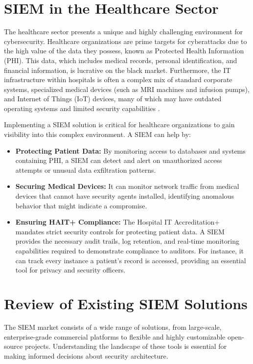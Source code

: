 \section{SIEM in the Healthcare Sector}
\label{sec:siem-in-healthcare}
The healthcare sector presents a unique and highly challenging environment for cybersecurity. Healthcare organizations are prime targets for cyberattacks due to the high value of the data they possess, known as Protected Health Information (PHI). This data, which includes medical records, personal identification, and financial information, is lucrative on the black market. Furthermore, the IT infrastructure within hospitals is often a complex mix of standard corporate systems, specialized medical devices (such as MRI machines and infusion pumps), and Internet of Things (IoT) devices, many of which may have outdated operating systems and limited security capabilities \cite{kruse_healthcare_cybersecurity}.

Implementing a SIEM solution is critical for healthcare organizations to gain visibility into this complex environment. A SIEM can help by:
\begin{itemize}
    \item \textbf{Protecting Patient Data:} By monitoring access to databases and systems containing PHI, a SIEM can detect and alert on unauthorized access attempts or unusual data exfiltration patterns.
    \item \textbf{Securing Medical Devices:} It can monitor network traffic from medical devices that cannot have security agents installed, identifying anomalous behavior that might indicate a compromise.
    \item \textbf{Ensuring HAIT+ Compliance:} The Hospital IT Accreditation+ mandates strict security controls for protecting patient data. A SIEM provides the necessary audit trails, log retention, and real-time monitoring capabilities required to demonstrate compliance to auditors. For instance, it can track every instance a patient's record is accessed, providing an essential tool for privacy and security officers.
\end{itemize}

\section{Review of Existing SIEM Solutions}
The SIEM market consists of a wide range of solutions, from large-scale, enterprise-grade commercial platforms to flexible and highly customizable open-source projects. Understanding the landscape of these tools is essential for making informed decisions about security architecture.
